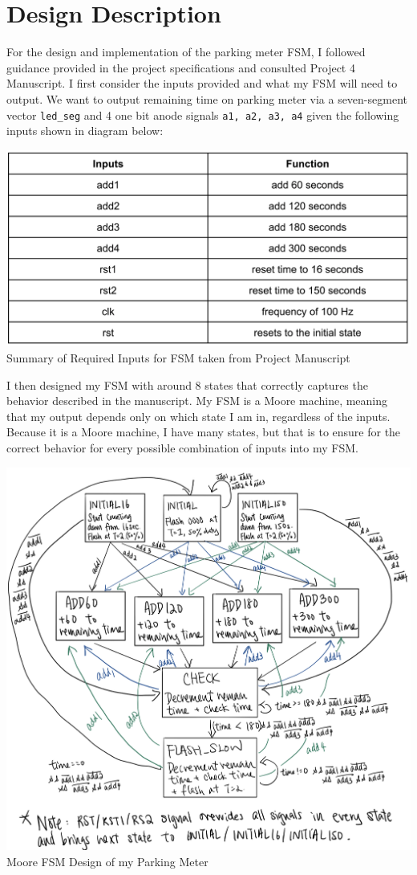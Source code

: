 \documentclass{article}
\begin{document}
\section{Design Description}
For the design and implementation of the parking meter FSM, I followed guidance provided in the project specifications and consulted Project 4 Manuscript. I first consider the inputs provided and what my FSM will need to output. We want to output remaining time on parking meter via a seven-segment vector \texttt{led\_seg} and 4 one bit anode signals \texttt{a1, a2, a3, a4} given the following inputs shown in diagram below:
\begin{center}
    \includegraphics[scale=0.4]{inputsummary.png} \\
    \caption{Summary of Required Inputs for FSM taken from Project Manuscript}
\end{center} 
I then designed my FSM with around 8 states that correctly captures the behavior described in the manuscript. My FSM is a Moore machine, meaning that my output depends only on which state I am in, regardless of the inputs. Because it is a Moore machine, I have many states, but that is to ensure for the correct behavior for every possible combination of inputs into my FSM. 
\begin{center}
    \includegraphics[scale=0.25]{FSM-diagram.jpeg} \\
    \caption{Moore FSM Design of my Parking Meter}
\end{center} 
\end{document}
